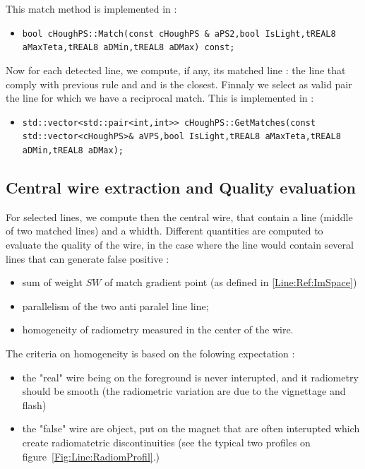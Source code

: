 This match method is implemented in :

\begin{itemize}
   \item {\tt  bool cHoughPS::Match(const cHoughPS \& aPS2,bool IsLight,tREAL8 aMaxTeta,tREAL8 aDMin,tREAL8 aDMax) const;}
\end{itemize}

Now for each detected line, we compute, if any, its matched line : the line that comply with previous rule and
and is the closest.  Finnaly we select as valid pair the line for which we have a reciprocal match.
This is implemented in :

\begin{itemize}
   \item {\tt std::vector<std::pair<int,int>> cHoughPS::GetMatches(const std::vector<cHoughPS>\&  aVPS,bool IsLight,tREAL8 aMaxTeta,tREAL8 aDMin,tREAL8 aDMax);}
\end{itemize}




\subsection{Central wire extraction and Quality evaluation}

For selected lines, we compute then the central wire, that contain a line (middle of two matched lines) and  a whidth.
Different quantities are computed to evaluate the quality of the wire, in the case where the line would contain
several lines that can generate false positive :


\begin{itemize}
   \item  sum of weight $SW$ of  match gradient point (as defined in \ref{Line:Ref:ImSpace})
   \item  parallelism of the two anti paralel line line;
   \item  homogeneity of radiometry measured in the center of the wire.
\end{itemize}


The criteria on homogeneity is based on the folowing expectation :

\begin{itemize}
   \item  the "real" wire being on the foreground is never interupted, and it radiometry should be
           smooth (the radiometric variation are due to the vignettage and flash)
   \item  the "false" wire are object, put on the magnet that are often interupted which create
          radiomatetric discontinuities (see the typical two profiles on  figure~\ref{Fig:Line:RadiomProfil}.)
\end{itemize}

